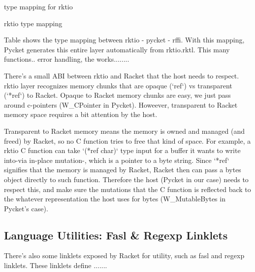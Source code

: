 				\begin{table-here}
					type mapping for rktio

					\begin{todo}
						rktio type mapping
					\end{todo}
				\end{table-here}

				\begin{paragraph-here}%
					Table shows the type mapping between rktio - pycket - rffi. With this mapping, Pycket generates this entire layer automatically from rktio.rktl. This many functions.. error handling, the works........
				\end{paragraph-here}

				\begin{paragraph-here}%
					There's a small ABI between rktio and Racket that the host needs to respect. rktio layer recognizes memory chunks that are opaque (`ref`) vs transparent (`*ref`) to Racket. Opaque to Racket memory chunks are easy, we just pass around c-pointers (W\_CPointer in Pycket). Howeever, transparent to Racket memory space requires a bit attention by the host.
				\end{paragraph-here}

				\begin{paragraph-here}%
					Transparent to Racket memory means the memory is owned and managed (and freed) by Racket, so no C function tries to free that kind of space. For example, a rktio C function can take `(*ref char)` type input for a buffer it wants to write into-via in-place mutation-, which is a pointer to a byte string. Since `*ref` signifies that the memory is managed by Racket, Racket then can pass a bytes object directly to such function. Therefore the host (Pycket in our case) needs to respect this, and make sure the mutations that the C function is reflected back to the whatever representation the host uses for bytes (W\_MutableBytes in Pycket's case).
				\end{paragraph-here}

		\subsection{Language Utilities: Fasl \& Regexp Linklets}

			\begin{paragraph-here}%
				There's also some linklets exposed by Racket for utility, such as fasl and regexp linklets. These linklets define .......
			\end{paragraph-here}

